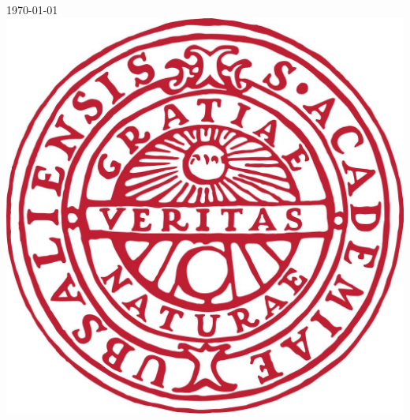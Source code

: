 \documentclass[a4paper, 12pt]{article}
\begin{document}
\begin{titlepage}


{\large \today}\\[2cm] %


\includegraphics[scale = 0.11]{figures/uulogga.png}\\[1cm] %
 

\vfill %

\end{titlepage}
\newpage\null\newpage %
\end{document}
